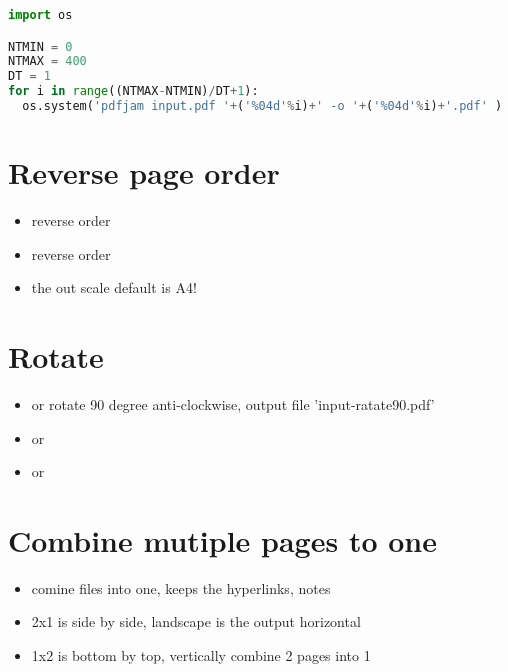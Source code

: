 \begin{lstlisting}[language=Python, caption={Split PDF using pdfjam and Python}]
import os

NTMIN = 0
NTMAX = 400
DT = 1
for i in range((NTMAX-NTMIN)/DT+1):
  os.system('pdfjam input.pdf '+('%04d'%i)+' -o '+('%04d'%i)+'.pdf' )
\end{lstlisting}

\section{Reverse page order}
\begin{itemize}
\item {} reverse order
\item {} reverse order
\item {} the out scale default is A4!
\end{itemize}

\section{Rotate}

\begin{itemize}
\item {} or  rotate 90 degree anti-clockwise, output file 'input-ratate90.pdf'
\item {} or 
\item {} or  
\end{itemize}


\section{Combine mutiple pages to one}

\begin{itemize}
\item {} comine files into one, keeps the hyperlinks, notes
\item {} 2x1 is side by side, landscape is the output horizontal
\item {} 1x2 is bottom by top, vertically combine 2 pages into 1
\end{itemize}


